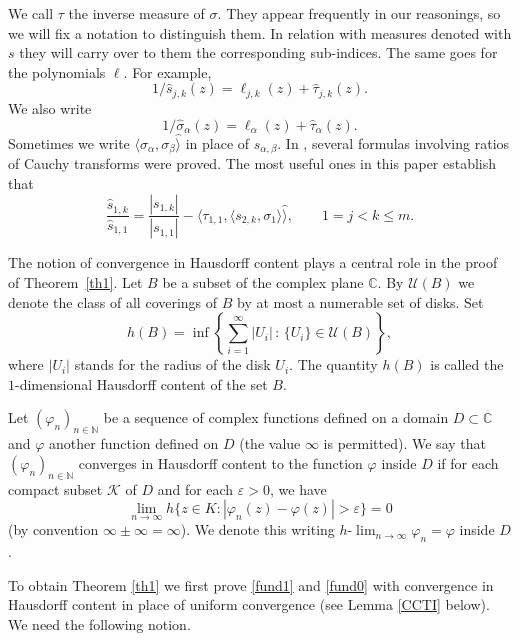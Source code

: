 \documentclass[10pt,a4paper]{article}
\theoremstyle{definition}
\theoremstyle{remark}
\numberwithin{equation}{section}
\begin{document}
We call $\tau$  the inverse measure of $\sigma.$ They appear frequently in our reasonings, so we will fix a
notation to distinguish them. In relation with measures  denoted with $s$ they will carry over to them the
corresponding sub-indices. The same goes for the  polynomials
$\ell$. For example,
\[
{1}/{\widehat{s}_{j,k}(z)}  ={\ell}_{j,k}(z)+
\widehat{\tau}_{j,k}(z).
\]
We also write
\[
{1}/{\widehat{\sigma}_{\alpha}(z)} ={\ell}_{\alpha }(z)+
\widehat{\tau}_{\alpha }(z).
\]
Sometimes we write $\langle
\sigma_{\alpha},\sigma_{\beta} \widehat{\rangle}$ in place of $\widehat{s}_{\alpha,\beta}$.  In \cite[Lemma 2.10]{FL4}, several formulas involving ratios of Cauchy transforms were proved. The most useful ones  in this paper establish that
\begin{equation} \label{4.4}
\frac{\widehat{s}_{1,k}}{\widehat{s}_{1,1}} =
\frac{|s_{1,k}|}{|s_{1,1}|} - \langle \tau_{1,1},\langle s_{2,k},\sigma_1
\rangle \widehat{\rangle}  , \qquad  1=j < k \leq m.
\end{equation}



The notion of convergence in Hausdorff content plays a central  role in the proof of Theorem~\ref{th1}. Let $B$ be a subset of the complex plane $\mathbb{C}$. By
$\mathcal{U}(B)$ we denote the class of all coverings of $B$ by at
most a numerable set of disks. Set
$$
h(B)=\inf\left\{\sum_{i=1}^\infty
|U_i|\,:\,\{U_i\}\in\mathcal{U}(B)\right\},
$$
where $|U_i|$ stands for the radius of the disk $U_i$. The quantity
$h(B)$ is called the $1$-dimensional Hausdorff content of the
set $B$.

Let $(\varphi_n)_{n\in\mathbb{N}}$ be a sequence of complex functions
defined on a domain $D\subset\mathbb{C}$ and $\varphi$ another
function defined on $D$ (the value $\infty$ is permitted). We say that
$(\varphi_n)_{n\in\mathbb{N}}$ converges in Hausdorff content to
the function $\varphi$ inside $D$ if for each compact
subset $\mathcal{K}$ of $D$ and for each $\varepsilon
>0$, we have
$$
\lim_{n\to\infty} h\{z\in K :
|\varphi_n(z)-\varphi(z)|>\varepsilon\}=0
$$
(by convention $\infty \pm \infty = \infty$). We denote this writing $h$-$\lim_{n\to \infty} \varphi_n =
\varphi$ inside $D$.

To obtain Theorem \ref{th1} we first prove \eqref{fund1} and \eqref{fund0} with convergence in Hausdorff content in place of uniform convergence (see Lemma \ref{CCTI} below). We need the following notion.\par
\end{document}
